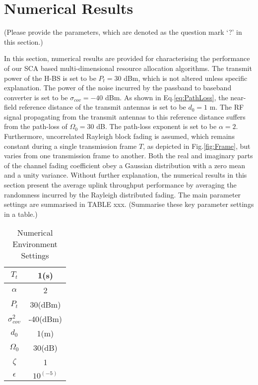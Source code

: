 \documentclass[12pt,draftcls,onecolumn,journal]{IEEEtran}
\begin{document}
\section{Numerical Results}

{\color{red} (Please provide the parameters, which are denoted as the question mark `?' in this section.)}

In this section, numerical results are provided for characterising the performance of our SCA based multi-dimensional resource allocation algorithms. The transmit power of the H-BS is set to be $P_t = 30$ dBm, which is not altered unless specific explanation. The power of the noise incurred by the passband to baseband converter is set to be $\sigma_{cov} = -40$ dBm. As shown in Eq.\eqref{eq:PathLoss}, the near-field reference distance of the transmit antennas is set to be $d_0 = 1$ m. The RF signal propagating from the transmit antennas to this reference distance suffers from the path-loss of $\Omega_0 = 30$ dB. The path-loss exponent is set to be $\alpha = 2$. Furthermore, uncorrelated Rayleigh block fading is assumed, which remains constant during a single transmission frame $T$, as depicted in Fig.\ref{fig:Frame}, but varies from one transmission frame to another. Both the real and imaginary parts of the channel fading coefficient obey a Gaussian distribution with a zero mean and a unity variance. Without further explanation, the numerical results in this section present the average uplink throughput performance by averaging the randomness incurred by the Rayleigh distributed fading. The main parameter settings are summarised in TABLE xxx. {\color{red} (Summarise these key parameter settings in a table.)}

\begin{table}[!t]
	\caption{Numerical Environment Settings}
	\begin{tabular}{|c|c|}
		\hline
		$T_{t}$ & 1(s)\\
		\hline
		$\alpha$ & 2 \\
		\hline
		$P_t$ & 30(dBm) \\
		\hline
		$\sigma_{cov}^2$ & -40(dBm) \\
		\hline
		$d_0$ & 1(m) \\
		\hline
		$\Omega_0$ & 30(dB) \\
		\hline
		$\zeta$ & 1 \\
		\hline
		$\epsilon$ & $10^{(-5)}$ \\
		\hline
	\end{tabular}
\end{table}
\end{document}
